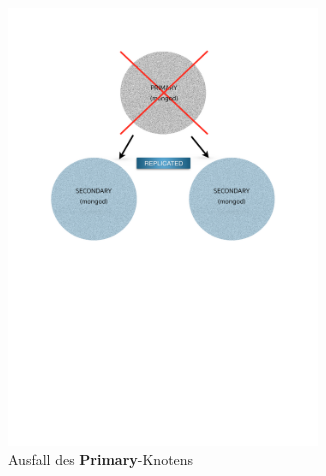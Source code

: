 \begin{figure}[H]
\begin{subfigure}[t]{0.49\textwidth}
      \includegraphics[trim = 28mm 139mm 28mm 29mm, clip, width=0.9\textwidth]{resources/replicaSet/selectNewPrimary}
     \caption[Ausfall des \textbf{Primary}-Knotens]{Ausfall des \textbf{Primary}-Knotens}
      \label{img:selectNewPrimary}
   \end{subfigure}\\[5pt]%
   \centering
   \begin{subfigure}[t]{0.49\textwidth}\vspace{0pt}
   \centering

\end{subfigure}
\end{figure}
